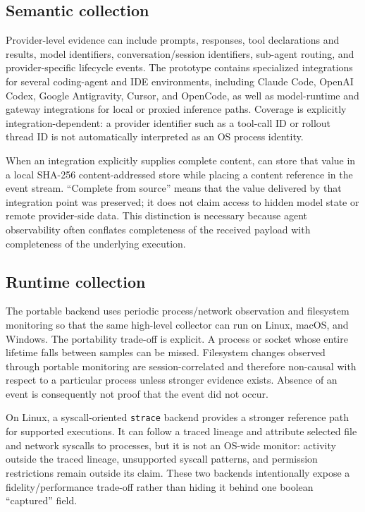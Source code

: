 \subsection{Semantic collection}
Provider-level evidence can include prompts, responses, tool declarations and results, model identifiers, conversation/session identifiers, sub-agent routing, and provider-specific lifecycle events. The prototype contains specialized integrations for several coding-agent and IDE environments, including Claude Code, OpenAI Codex, Google Antigravity, Cursor, and OpenCode, as well as model-runtime and gateway integrations for local or proxied inference paths. Coverage is explicitly integration-dependent: a provider identifier such as a tool-call ID or rollout thread ID is not automatically interpreted as an OS process identity.

When an integration explicitly supplies complete content, \system can store that value in a local SHA-256 content-addressed store while placing a content reference in the event stream. ``Complete from source'' means that the value delivered by that integration point was preserved; it does not claim access to hidden model state or remote provider-side data. This distinction is necessary because agent observability often conflates completeness of the received payload with completeness of the underlying execution.

\subsection{Runtime collection}
The portable backend uses periodic process/network observation and filesystem monitoring so that the same high-level collector can run on Linux, macOS, and Windows. The portability trade-off is explicit. A process or socket whose entire lifetime falls between samples can be missed. Filesystem changes observed through portable monitoring are session-correlated and therefore non-causal with respect to a particular process unless stronger evidence exists. Absence of an event is consequently not proof that the event did not occur.

On Linux, a syscall-oriented \texttt{strace} backend provides a stronger reference path for supported executions. It can follow a traced lineage and attribute selected file and network syscalls to processes, but it is not an OS-wide monitor: activity outside the traced lineage, unsupported syscall patterns, and permission restrictions remain outside its claim. These two backends intentionally expose a fidelity/performance trade-off rather than hiding it behind one boolean ``captured'' field.

